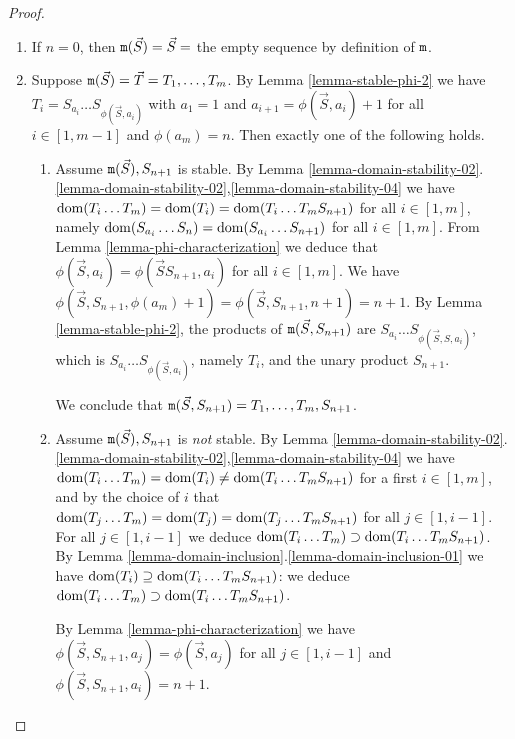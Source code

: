 \documentclass{lmcs}
\begin{document}
\begin{proof}
\begin{enumerate}
\item
If $n=0$, then ${\tt m}(\vec{S}) = \vec{S} = $ the empty sequence by definition
of ${\tt m}$.

\item
Suppose ${\tt m}(\vec{S}) = \vec{T} = T_1, \ldots, T_m$.  
By Lemma \ref{lemma-stable-phi-2}
we have $T_i = S_{a_i} \ldots S_{\phi(\vec{S},a_i)}$ with 
$a_1=1$ and $a_{i+1} = \phi(\vec{S},a_i)+1$ 
for all $i \in [1,m-1]$ and $\phi(a_{m}) = n$.  Then exactly one of the following holds.

\begin{enumerate}

\item
Assume ${\tt m}(\vec{S}), S_{n+1}$ is stable. By 
Lemma \ref{lemma-domain-stability-02}.
\ref{lemma-domain-stability-02},\ref{lemma-domain-stability-04} 
we have
${\rm dom}(T_i \ldots T_m) = {\rm dom}(T_i ) = {\rm dom}(T_i \ldots T_m S_{n+1})$ for all $i \in [1,m]$,
namely ${\rm dom}(S_{a_i} \ldots S_n) = {\rm dom}(S_{a_i} \ldots  S_{n+1})$ for all $i \in [1,m]$.
From Lemma \ref{lemma-phi-characterization} we deduce that $\phi(\vec{S},a_i) = 
\phi(\vec{S}S_{n+1},a_i)$ for all $i \in [1,m]$. We have 
$\phi(\vec{S},S_{n+1},\phi(a_{m}) +1)
= \phi(\vec{S},S_{n+1},n+1)=n+1$. By Lemma \ref{lemma-stable-phi-2}, the products of
${\tt m}(\vec{S},S_{n+1})$ are $S_{a_i} \ldots S_{\phi(\vec{S},S,a_i)}$, which is
$S_{a_i} \ldots S_{\phi(\vec{S},a_i)}$, namely $T_i$, and the unary product $S_{n+1}$.

We conclude that ${\tt m}(\vec{S}, S_{n+1}) = T_1, \ldots, T_m, S_{n+1}$.

\item
Assume ${\tt m}(\vec{S}), S_{n+1}$ is \emph{not} stable. By 
Lemma \ref{lemma-domain-stability-02}.
\ref{lemma-domain-stability-02},\ref{lemma-domain-stability-04} 
we have
${\rm dom}(T_i \ldots T_m) = {\rm dom}(T_i ) \not = {\rm dom}(T_i \ldots T_m S_{n+1})$ 
for a first $i \in [1,m]$, and by the choice of $i$ that 
${\rm dom}(T_j \ldots T_m) = {\rm dom}(T_j ) = {\rm dom}(T_j \ldots T_m S_{n+1})$ for all $j \in [1,i-1]$.
For all $j \in [1,i-1]$ we deduce ${\rm dom}(T_i \ldots T_m)\supset {\rm dom}(T_i \ldots T_m S_{n+1})$.
By Lemma \ref{lemma-domain-inclusion}.\ref{lemma-domain-inclusion-01}
we have ${\rm dom}(T_i ) \supseteq  {\rm dom}(T_i \ldots T_m S_{n+1})$:
we deduce ${\rm dom}(T_i \ldots T_m) \supset {\rm dom}(T_i \ldots T_m S_{n+1})$.

By Lemma \ref{lemma-phi-characterization} we have 
$\phi(\vec{S},S_{n+1},a_j) = \phi(\vec{S},a_j)$ for all $j \in [1,i-1]$ and 
$\phi(\vec{S},S_{n+1},a_i) = n+1$. 


\end{enumerate}
\end{enumerate}
\end{proof}
\end{document}
